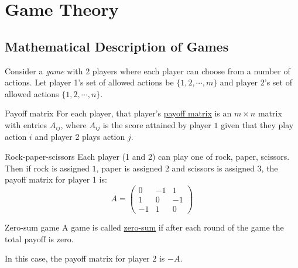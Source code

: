 \documentclass[../Main.tex]{subfiles}
\begin{document}
\section{Game Theory}
\subsection{Mathematical Description of Games}
Consider a \textit{game} with 2 players where each player can choose from a number of actions. Let player 1's set of allowed actions be $\{1, 2, \cdots, m\}$ and player 2's set of allowed actions $\{1, 2, \cdots, n\}$.

\begin{definition}{Payoff matrix}
    For each player, that player's \underline{payoff matrix} is an $m \times n$ matrix with entries $A_{ij}$, where $A_{ij}$ is the score attained by player $1$ given that they play action $i$ and player 2 plays action $j$.
\end{definition}
\begin{example}{Rock-paper-scissors}
    Each player (1 and 2) can play one of rock, paper, scissors. Then if rock is assigned $1$, paper is assigned $2$ and scissors is assigned $3$, the payoff matrix for player 1 is:
    \begin{equation*}
        A =
        \begin{pmatrix}
            0 & -1 & 1 \\
            1 & 0 & -1 \\
            -1 & 1 & 0
        \end{pmatrix}
    \end{equation*}
\end{example}
\begin{definition}{Zero-sum game}
    A game is called \underline{zero-sum} if after each round of the game the total payoff is zero.
\end{definition}
In this case, the payoff matrix for player 2 is $-A$.
\end{document}
